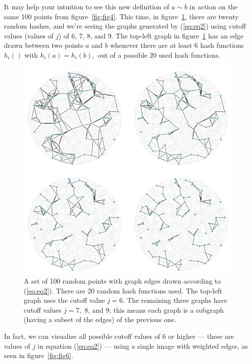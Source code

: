 \documentclass[20pt,]{extarticle}
\begin{document}
It may help your intuition to see this new definition of \(a\sim b\) in
action on the same 100 points from figure~\ref{fig:fig4}. This time, in
figure~\ref{fig:fig5}, there are twenty random hashes, and we're seeing
the graphs generated by (\ref{eq:eq2}) using cutoff values (values of
\(j\)) of 6, 7, 8, and 9. The top-left graph in figure~\ref{fig:fig5}
has an edge drawn between two points \(a\) and \(b\) whenever there are
at least 6 hash functions \(h_i()\) with \(h_i(a) = h_i(b),\) out of a
possible 20 used hash functions.

\begin{figure}
\centering
\includegraphics{images/lsh_image5.png}
\caption{A set of 100 random points with graph edges drawn according to
(\ref{eq:eq2}). There are 20 random hash functions used. The top-left
graph uses the cutoff value \(j=6.\) The remaining three graphs have
cutoff values \(j=7,\) 8, and 9; this means each graph is a subgraph
(having a subset of the edges) of the previous one.}\label{fig:fig5}
\end{figure}

In fact, we can visualize all possible cutoff values of 6 or higher ---
these are values of \(j\) in equation (\ref{eq:eq2}) --- using a single
image with weighted edges, as seen in figure~\ref{fig:fig6}.
\end{document}
